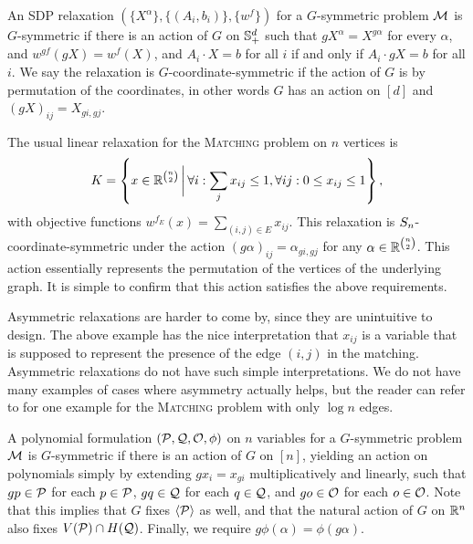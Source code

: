 \begin{definition}
An SDP relaxation $(\{X^\alpha\},\{(A_i,b_i)\},\{w^f\})$ for a $G$-symmetric problem $\mathcal M$ is $G$-symmetric if there is an action of $G$ on $\mathbb{S}^{d}_+$ such that $gX^\alpha = X^{g\alpha}$ for every $\alpha$, and $w^{gf}(gX) = w^f(X)$, and $A_i \cdot X = b$ for all $i$ if and only if $A_i \cdot gX = b$ for all $i$. We say the relaxation is $G$-coordinate-symmetric if the action of $G$ is by permutation of the coordinates, in other words $G$ has an action on $[d]$ and $(gX)_{ij} = X_{gi,gj}$.
\end{definition}
\begin{example}
The usual linear relaxation for the \textsc{Matching} problem on $n$ vertices is
\[K = \left\{x \in \mathbb R^{\binom{n}{2}} \, \bigg{|} \, \forall i: \sum_j x_{ij} \leq 1, \forall ij: 0 \leq x_{ij} \leq 1\right\},\]
with objective functions $w^{f_E}(x) = \sum_{(i,j) \in E} x_{ij}$. This relaxation is $S_{n}$-coordinate-symmetric under the action $(g\alpha)_{ij} = \alpha_{gi,gj}$ for any $\alpha \in \mathbb R^{\binom{n}{2}}$. This action essentially represents the permutation of the vertices of the underlying graph. It is simple to confirm that this action satisfies the above requirements. 
\end{example}
Asymmetric relaxations are harder to come by, since they are unintuitive to design. The above example has the nice interpretation that $x_{ij}$ is a variable that is supposed to represent the presence of the edge $(i,j)$ in the matching. Asymmetric relaxations do not have such simple interpretations. We do not have many examples of cases where asymmetry actually helps, but the reader can refer to \cite{KPT10} for one example for the \textsc{Matching} problem with only $\log n$ edges.

\begin{definition}
A polynomial formulation $(\mathcal P,\mathcal Q,\mathcal O,\phi)$ on $n$ variables for a $G$-symmetric problem $\mathcal M$ is $G$-symmetric if there is an action of $G$ on $[n]$, yielding an action on polynomials simply by extending $gx_i = x_{gi}$ multiplicatively and linearly, such that $gp \in \mathcal P$ for each $p \in \mathcal P$, $gq \in \mathcal Q$ for each $q \in \mathcal Q$, and $go \in \mathcal O$ for each $o \in \mathcal O$. Note that this implies that $G$ fixes $\langle \mathcal P \rangle$ as well, and that the natural action of $G$ on $\mathbb R^n$ also fixes $V(\mathcal P) \cap H(\mathcal Q)$. Finally, we require $g\phi(\alpha) = \phi(g\alpha)$.
\end{definition}

